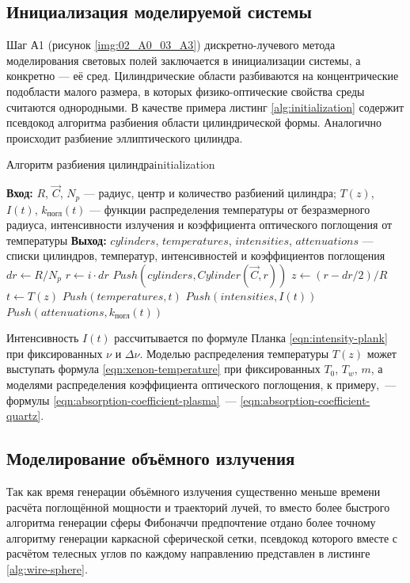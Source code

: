 \subsection{Инициализация моделируемой системы}

Шаг А1 (рисунок \ref{img:02_A0_03_A3}) дискретно-лучевого метода моделирования световых полей заключается в инициализации системы, а конкретно — её сред. Цилиндрические области разбиваются на концентрические подобласти малого размера, в которых физико-оптические свойства среды считаются однородными. В качестве примера листинг \ref{alg:initialization} содержит псевдокод алгоритма разбиения области цилиндрической формы.
Аналогично происходит разбиение эллиптического цилиндра.

\begin{Algorithm}{Алгоритм разбиения цилиндра}{initialization}
	\begin{algorithmic}[1]
		\State \textbf{Вход:} $R$, $\vec C$, $N_p$ — радиус, центр и количество разбиений цилиндра; $T(z)$, $I(t)$, $k_{\text{погл}}(t)$ — функции распределения температуры от безразмерного радиуса, интенсивности излучения и коэффициента оптического поглощения от температуры
		\State \textbf{Выход:} $cylinders$, $temperatures$, $intensities$, $attenuations$ — списки цилиндров, температур, интенсивностей и коэффициентов поглощения
		\State $dr \gets R / N_p$
			\State $r \gets i \cdot dr$
			\State $Push(cylinders, Cylinder(\vec C, r))$
			\State $z \gets (r - dr / 2) / R$
			\State $t \gets T(z)$
			\State $Push(temperatures, t)$
			\State $Push(intensities, I(t))$
			\State $Push(attenuations, k_{\text{погл}}(t))$
		\EndFor
	\end{algorithmic}
\end{Algorithm}

Интенсивность $I(t)$ рассчитывается по формуле Планка \eqref{eqn:intensity-plank} при фиксированных $\nu$ и $\Delta\nu$.
Моделью распределения температуры $T(z)$ может выступать формула \eqref{eqn:xenon-temperature} при фиксированных $T_0$, $T_w$, $m$, а моделями распределения коэффициента оптического поглощения, к примеру,~— формулы \eqref{eqn:absorption-coefficient-plasma}~— \eqref{eqn:absorption-coefficient-quartz}.

\subsection{Моделирование объёмного излучения}

Так как время генерации объёмного излучения существенно меньше времени расчёта поглощённой мощности и траекторий лучей, то вместо более быстрого алгоритма генерации сферы Фибоначчи предпочтение отдано более точному алгоритму генерации каркасной сферической сетки, псевдокод которого вместе с расчётом телесных углов по каждому направлению представлен в листинге \ref{alg:wire-sphere}.

